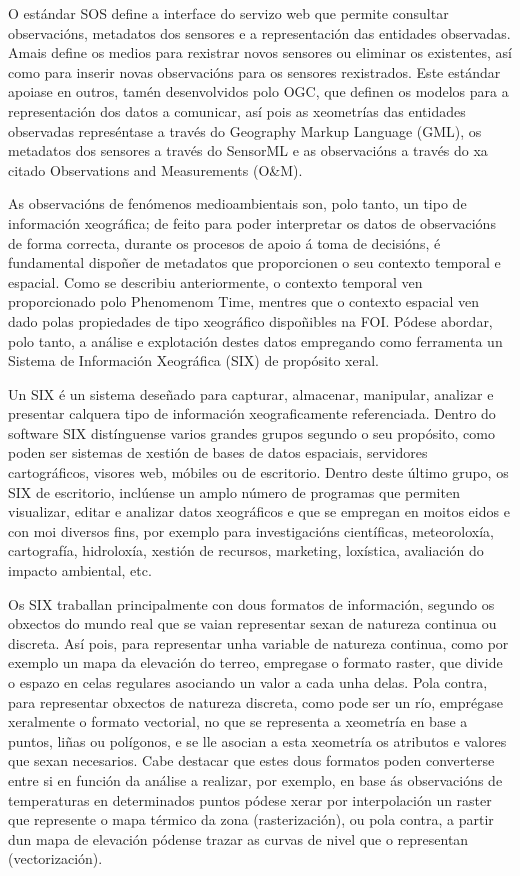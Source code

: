 O estándar SOS define a interface do servizo web que permite consultar observacións, metadatos dos sensores e a representación das entidades observadas. Amais define os medios para rexistrar novos sensores ou eliminar os existentes, así como para inserir novas observacións para os sensores rexistrados. Este estándar apoiase en outros, tamén desenvolvidos polo OGC, que definen os modelos para a representación dos datos a comunicar, así pois as xeometrías das entidades observadas represéntase a través do Geography Markup Language (GML), os metadatos dos sensores a través do SensorML e as observacións a través do xa citado Observations and Measurements (O\&M).

As observacións de fenómenos medioambientais son, polo tanto, un tipo de información xeográfica; de feito para poder interpretar os datos de observacións de forma correcta, durante os procesos de apoio á toma de decisións, é fundamental dispoñer de metadatos que proporcionen o seu contexto temporal e espacial. Como se describiu anteriormente, o contexto temporal ven proporcionado polo Phenomenom Time, mentres que o contexto espacial ven dado polas propiedades de tipo xeográfico dispoñibles na FOI. Pódese abordar, polo tanto, a análise e explotación destes datos empregando como ferramenta un Sistema de Información Xeográfica (SIX) de propósito xeral.

Un SIX é un sistema deseñado para capturar, almacenar, manipular, analizar e presentar calquera tipo de información xeograficamente referenciada. Dentro do software SIX distínguense varios grandes grupos segundo o seu propósito, como poden ser sistemas de xestión de bases de datos espaciais, servidores cartográficos, visores web, móbiles ou de escritorio. Dentro deste último grupo, os SIX de escritorio, inclúense un amplo número de programas que permiten visualizar, editar e analizar datos xeográficos e que se empregan en moitos eidos e con moi diversos fins, por exemplo para investigacións científicas, meteoroloxía, cartografía, hidroloxía, xestión de recursos, marketing, loxística, avaliación do impacto ambiental, etc.

Os SIX traballan principalmente con dous formatos de información, segundo os obxectos do mundo real que se vaian representar sexan de natureza continua ou discreta. Así pois, para representar unha variable de natureza continua, como por exemplo un mapa da elevación do terreo, empregase o formato raster, que divide o espazo en celas regulares asociando un valor a cada unha delas. Pola contra, para representar obxectos de natureza discreta, como pode ser un río, emprégase xeralmente o formato vectorial, no que se representa a xeometría en base a puntos, liñas ou polígonos, e se lle asocian a esta xeometría os atributos e valores que sexan necesarios. Cabe destacar que estes dous formatos poden converterse entre si en función da análise a realizar, por exemplo, en base ás observacións de temperaturas en determinados puntos pódese xerar por interpolación un raster que represente o mapa térmico da zona (rasterización), ou pola contra, a partir dun mapa de elevación pódense trazar as curvas de nivel que o representan (vectorización).

